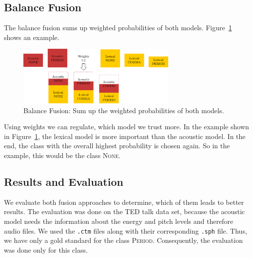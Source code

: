 \subsection{Balance Fusion}
The balance fusion sums up weighted probabilities of both models.
Figure~\ref{fig:fusion_2} shows an example.
\begin{figure}[ht]
    \centering
    \includegraphics[width=0.7\textwidth]{img/fusion_2.pdf}
    \caption{Balance Fusion: Sum up the weighted probabilities of both models.}
    \label{fig:fusion_2}
\end{figure}
Using weights we can regulate, which model we trust more.
In the example shown in Figure~\ref{fig:fusion_2}, the lexical model is more important than the acoustic model.
In the end, the class with the overall highest probability is chosen again.
So in the example, this would be the class \textsc{None}.

\subsection{Results and Evaluation}
We evaluate both fusion approaches to determine, which of them leads to better results.
The evaluation was done on the TED talk data set, because the acoustic model needs the information about the energy and pitch levels and therefore audio files.
We used the \texttt{.ctm} files along with their corresponding \texttt{.sph} file.
Thus, we have only a gold standard for the class \textsc{Period}.
Consequently, the evaluation was done only for this class.

